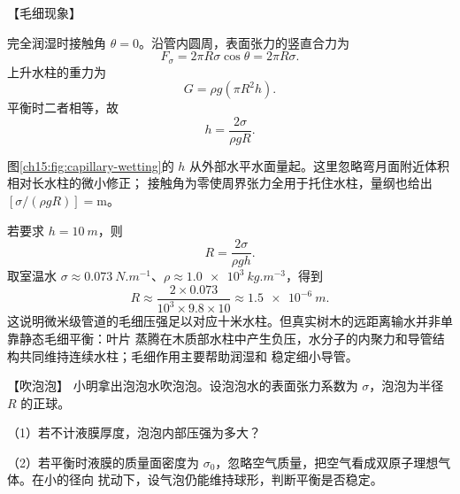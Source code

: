 {\begin{origexamplebox}{【毛细现象】}
\ThQCapillary
\end{origexamplebox}\par\nopagebreak[4]

\par\nopagebreak[4]\begin{xesolution}
完全润湿时接触角 $\theta=0$。沿管内圆周，表面张力的竖直合力为
\begin{equation*}
  F_\sigma=2\pi R\sigma\cos\theta=2\pi R\sigma.
\end{equation*}
上升水柱的重力为
\begin{equation*}
  G=\rho g(\pi R^2h).
\end{equation*}
平衡时二者相等，故
\begin{equation}
  \boxed{h=\frac{2\sigma}{\rho gR}}.
\end{equation}

\par\noindent\begin{minipage}{\linewidth}
\capillaryRevisionDiagram
{}\label{ch15:fig:capillary-wetting}
\end{minipage}\par\medskip
图\ref{ch15:fig:capillary-wetting}的 $h$ 从外部水平水面量起。这里忽略弯月面附近体积相对长水柱的微小修正；
接触角为零使周界张力全用于托住水柱，量纲也给出 $[\sigma/(\rho gR)]=\mathrm m$。

若要求 $h=\SI{10}{m}$，则
\begin{equation*}
  \boxed{R=\frac{2\sigma}{\rho gh}}.
\end{equation*}
取室温水 $\sigma\approx\SI{0.073}{N.m^{-1}}$、$\rho\approx\SI{1.0e3}{kg.m^{-3}}$，得到
\begin{equation*}
  R\approx\frac{2\times0.073}{10^3\times9.8\times10}
  \approx\SI{1.5e-6}{m}.
\end{equation*}
这说明微米级管道的毛细压强足以对应十米水柱。但真实树木的远距离输水并非单靠静态毛细平衡：叶片
蒸腾在木质部水柱中产生负压，水分子的内聚力和导管结构共同维持连续水柱；毛细作用主要帮助润湿和
稳定细小导管。
\end{xesolution}


\begin{origexamplebox}{【吹泡泡】}\label{ch15:ex:s29-20-7}
小明拿出泡泡水吹泡泡。设泡泡水的表面张力系数为 $\sigma$，泡泡为半径 $R$ 的正球。

（1）若不计液膜厚度，泡泡内部压强为多大？

（2）若平衡时液膜的质量面密度为 $\sigma_0$，忽略空气质量，把空气看成双原子理想气体。在小的径向
扰动下，设气泡仍能维持球形，判断平衡是否稳定。


\end{origexamplebox}}
